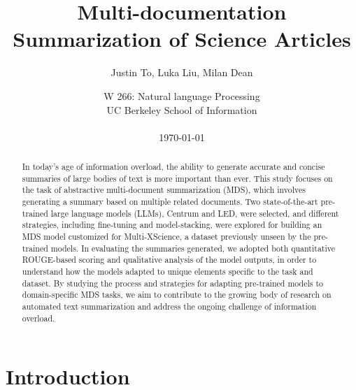 \documentclass[12pt, twocolumn]{article}
\numberwithin{equation}{section}
\begin{document}
\sloppy %

\title{Multi-documentation Summarization of Science Articles}
\author{Justin To, Luka Liu, Milan Dean}
\date{
    W 266: Natural language Processing
    \\UC Berkeley School of Information
    \\~
    \\\today
}
\maketitle

\begin{abstract}%

In today's age of information overload, the ability to generate accurate and concise summaries of large bodies of text is more important than ever. This study focuses on the task of abstractive multi-document summarization (MDS), which involves generating a summary based on multiple related documents. Two state-of-the-art pre-trained large language models (LLMs), Centrum and LED, were selected, and different strategies, including fine-tuning and model-stacking, were explored for building an MDS model customized for Multi-XScience, a dataset previously unseen by the pre-trained models. In evaluating the summaries generated, we adopted both quantitative ROUGE-based scoring and qualitative analysis of the model outputs, in order to understand how the models adapted to unique elements specific to the task and dataset. By studying the process and strategies for adapting pre-trained models to domain-specific MDS tasks, we aim to contribute to the growing body of research on automated text summarization and  address the ongoing challenge of information overload.

\end{abstract}

\section{Introduction}
\end{document}
